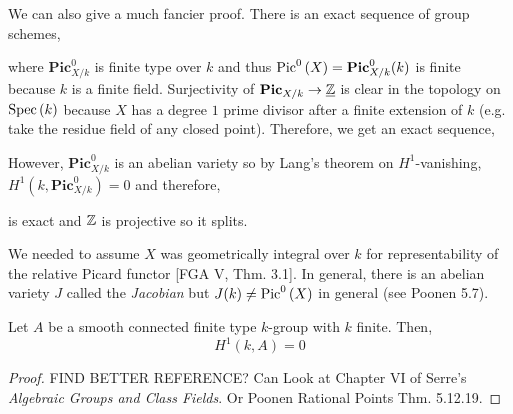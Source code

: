 \documentclass[12pt]{article}
\begin{document}
\newcommand{\sPic}[1]{\mathbf{Pic}_{#1}}
\newcommand{\csPic}[1]{\mathbf{Pic}^0_{#1}}

\begin{rmk}
We can also give a much fancier proof. There is an exact sequence of group schemes,
\begin{center}
\end{center}
where $\csPic{X/k}$ is finite type over $k$ and thus $\Picz{X} = \csPic{X/k}(k)$ is finite because $k$ is a finite field. Surjectivity of $\sPic{X/k} \to \underline{\Z}$ is clear in the \etale topology on $\mathrm{Spec}\left( k \right)$ because $X$ has a degree $1$ prime divisor after a finite extension of $k$ (e.g. take the residue field of any closed point). Therefore, we get an exact sequence,
\begin{center}
\end{center}
However, $\csPic{X/k}$ is an abelian variety so by Lang's theorem on $H^1$-vanishing, $H^1(k, \csPic{X/k}) = 0$ and therefore,
\begin{center}
\end{center}
is exact and $\mathbb{Z}$ is projective so it splits.
\end{rmk}

\begin{rmk}
We needed to assume $X$ was geometrically integral over $k$ for representability of the relative Picard functor [FGA V, Thm. 3.1]. In general, there is an abelian variety $J$ called the \textit{Jacobian} but $J(k) \neq \mathrm{Pic}^0\left( X \right)$ in general (see Poonen 5.7).  
\end{rmk}

\begin{theorem}[Lang]
Let $A$ be a smooth connected finite type $k$-group with $k$ finite. Then,
\[ H^1(k, A) = 0 \]
\end{theorem}

\begin{proof}
FIND BETTER REFERENCE? Can Look at Chapter VI of Serre’s \textit{Algebraic Groups and Class Fields}. Or Poonen Rational Points Thm. 5.12.19.
\end{proof}
\end{document}
